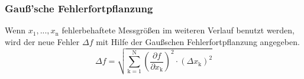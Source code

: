 \subsubsection{Gauß'sche Fehlerfortpflanzung}
Wenn $x_\text{1}, ..., x_\text{n}$ fehlerbehaftete Messgrößen im weiteren Verlauf benutzt werden, wird der neue Fehler $\Delta f$ mit Hilfe der Gaußschen Fehlerfortpflanzung angegeben.
\begin{equation}
	\Delta f = \sqrt{\sum_{\text{k}=1}^\text{N} \left( \frac{ \partial f}{\partial x_\text{k}} \right) ^2 \cdot (\Delta x_\text{k})^2}
	\label{eqn:var}
\end{equation}

